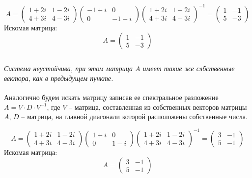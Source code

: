 \documentclass[a5paper, 10pt]{article}
\theoremstyle{definition}
\theoremstyle{plain}
\theoremstyle{remark}
\begin{document}
\begin{equation}
A =
\begin{pmatrix}
1 + 2i &  1 - 2i \\
4 + 3i & 4 - 3i
\end{pmatrix}
\begin{pmatrix}
-1 + i &  0 \\
0 & -1 -i
\end{pmatrix}
\begin{pmatrix}
1 + 2i &  1 - 2i \\
4 + 3i & 4 - 3i
\end{pmatrix}^{-1}
=
\begin{pmatrix}
1 & -1  \\
5 & -3
\end{pmatrix}
\end{equation}
Искомая матрица:
\begin{equation}
A =
\begin{pmatrix}
1 & -1  \\
5 & -3
\end{pmatrix}
\end{equation}

\subsection{}
\textit{Система неустойчива, при этом матрица $A$ имеет такие же слбственные вектора, как в предыдущем пункте.}\\
\\
Аналогично будем искать матрицу записав ее спектральное разложение $ A = V \cdot D \cdot V^{-1}$, где $V$ -- матрица, составленная из собственных векторов матрицы $A$, $D$ -- матрица, на главной диагонали которой расположены собственные числа.

\begin{equation}
A =
\begin{pmatrix}
1 + 2i &  1 - 2i \\
4 + 3i & 4 - 3i
\end{pmatrix}
\begin{pmatrix}
1+ i &  0 \\
0 & 1 -i
\end{pmatrix}
\begin{pmatrix}
1 + 2i &  1 - 2i \\
4 + 3i & 4 - 3i
\end{pmatrix}^{-1}
=
\begin{pmatrix}
3 & -1  \\
5 & -1
\end{pmatrix}
\end{equation}
Искомая матрица:
\begin{equation}
A =
\begin{pmatrix}
3 & -1  \\
5 & -1
\end{pmatrix}
\end{equation}
\end{document}
